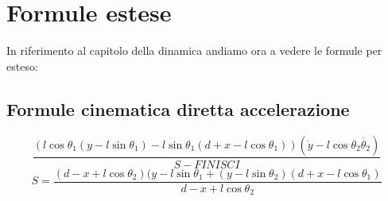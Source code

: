 \section{Formule estese}
In riferimento al capitolo della dinamica andiamo ora a vedere le formule per esteso:
\subsection{Formule cinematica diretta accelerazione}
\begin{equation}
\frac{(l\cos\theta_1(y - l\sin\theta_1) - l\sin\theta_1(d + x - l\cos\theta_1))(\dot{y} - l\cos\theta_2\dot{\theta_2})}{S-FINISCI}
\end{equation}
\begin{equation*}
S = \frac{(d - x + l\cos\theta_2)(y - l\sin\theta_1 + (y - l\sin\theta_2)(d + x - l\cos\theta_1)}{d - x + l\cos\theta_2}
\end{equation*}
